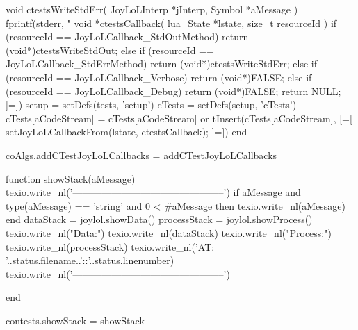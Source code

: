 void ctestsWriteStdErr(
  JoyLoLInterp *jInterp,
  Symbol       *aMessage
) {
  fprintf(stderr, "%
}
void *ctestsCallback(
  lua_State *lstate,
  size_t resourceId
) {
  if (resourceId == JoyLoLCallback_StdOutMethod) {
    return (void*)ctestsWriteStdOut;
  } else if (resourceId == JoyLoLCallback_StdErrMethod) {
    return (void*)ctestsWriteStdErr;
  } else if (resourceId == JoyLoLCallback_Verbose) {
    return (void*)FALSE;
  } else if (resourceId == JoyLoLCallback_Debug) {
    return (void*)FALSE;
  }
  return NULL;
} 
]=])
  setup               = setDefs(tests, 'setup')
  cTests              = setDefs(setup, 'cTests')
  cTests[aCodeStream] = cTests[aCodeStream] or { }
  tInsert(cTests[aCodeStream], [=[
setJoyLoLCallbackFrom(lstate, ctestsCallback);
]=])
end

coAlgs.addCTestJoyLoLCallbacks = addCTestJoyLoLCallbacks
\stopLuaCode

\startMkIVCode
\def\setJoylolVerboseOn{%
  \directlua{thirddata.joylol.setVerbose(true)}
}

\def\setJoylolVerboseOff{%
  \directlua{thirddata.joylol.setVerbose(false)}
}

\def\setJoylolDebuggingOn{%
  \directlua{thirddata.joylol.setDebugging(true)}
}

\def\setJoylolDebuggingOff{%
  \directlua{thirddata.joylol.setVDebugging(false)}
}

\def\setJoylolTracingOn{%
  \directlua{thirddata.joylol.setTracing(true)}
}

\def\setJoylolTracingOff{%
  \directlua{thirddata.joylol.setTracing(false)}
}

\def\setJoylolShowStackOn{%
  \directlua{thirddata.joylol.setShowStack(true)}
}

\def\setJoylolShowStackOff{%
  \directlua{thirddata.joylol.setShowStack(false)}
}

\def\setJoylolShowSpecificationsOn{%
  \directlua{thirddata.joylol.setShowSpecifications(true)}
}

\def\setJoylolShowSpecificationsOff{%
  \directlua{thirddata.joylol.setShowSpecifications(false)}
}

\def\setJoylolCheckingOn{%
  \directlua{thirddata.joylol.setChecking(true)}
}

\def\setJoylolCheckingOff{%
  \directlua{thirddata.joylol.setChecking(false)}
}
\stopMkIVCode

\startLuaCode
function showStack(aMessage) 
  texio.write_nl('-----------------------------------------------')
  if aMessage and type(aMessage) == 'string' and 0 < #aMessage then
    texio.write_nl(aMessage)
  end
  dataStack    = joylol.showData()
  processStack = joylol.showProcess()
  texio.write_nl("Data:")
  texio.write_nl(dataStack)
  texio.write_nl("Process:")
  texio.write_nl(processStack)
  texio.write_nl('AT: '..status.filename..'::'..status.linenumber)
  texio.write_nl('-----------------------------------------------')

end

contests.showStack = showStack
\stopLuaCode
